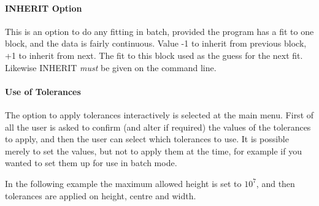 \documentclass[11pt,twoside]{article}
\begin{document}
\paragraph{INHERIT Option}

This is an option to do any fitting in batch, provided the program has
a fit to one block, and the data is fairly continuous. Value -1 to
inherit from previous block, +1 to inherit from next.
The fit to this block used as the guess for the next fit.
Likewise INHERIT {\em must} be given on the command line.

\paragraph{Use of Tolerances}
\label{sec.tols}

The option to apply tolerances interactively is selected at the main
menu.
First of all the user is asked to confirm (and alter if required) the
values of the tolerances to apply, and then the user can select which
tolerances to use.
It is possible merely to set the values, but not to apply them at the
time, for example if you wanted to set them up for use in batch mode.

In the following example the maximum allowed height is set to $10^{7}$,
and then tolerances are applied on height, centre and width.
\end{document}
